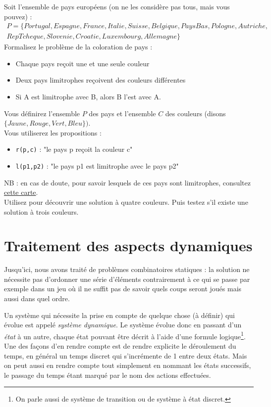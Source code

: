 Soit l'ensemble de pays européens (on ne les considère pas tous, mais vous pouvez) : \\
\begin{multline}
P = \{Portugal, Espagne, France, Italie, Suisse, Belgique, PaysBas, Pologne, Autriche,\\ RepTcheque, Slovenie, Croatie, Luxembourg, Allemagne\}
\end{multline}
Formalisez le problème de la coloration de pays : 
\begin{itemize}
\item Chaque pays reçoit une et une seule couleur
\item Deux pays limitrophes reçoivent des couleurs différentes
\item Si A est limitrophe avec B, alors B l'est avec A. 
\end{itemize}
Vous définirez l'ensemble $P$ des pays et l'ensemble $C$ des couleurs (disons $\{Jaune, Rouge, Vert, Bleu\})$. \\

\noindent Vous utiliserez les propositions : 
\begin{itemize}
\item \texttt{r(p,c)} : "le pays p reçoit la couleur c"
\item \texttt{l(p1,p2)} : "le pays p1 est limitrophe avec le pays p2"
\end{itemize}

NB : en cas de doute, pour savoir lesquels de ces pays sont limitrophes, consultez \href{https://upload.wikimedia.org/wikipedia/commons/6/6a/Europe_countries_map_fr.png}{cette carte}. \\

Utilisez \touist pour découvrir une solution à quatre couleurs. Puis testez s'il existe une solution à trois couleurs. 
\newpage
\section{Traitement des aspects dynamiques}\label{sec:prob}
Jusqu'ici, nous avons traité de problèmes combinatoires statiques : la solution ne nécessite pas d'ordonner une série d'éléments contrairement à ce qui se passe par exemple dans un jeu où il ne suffit pas de savoir quels coups seront joués mais aussi dans quel ordre. 

Un système qui nécessite la prise en compte de quelque chose (à définir) qui évolue est appelé \emph{système dynamique}. Le système évolue donc en passant d'un \emph{état} à un autre, chaque état pouvant être décrit à l'aide d'une formule logique\footnote{On parle aussi de système de transition ou de système à état discret.}. Une des façons d'en rendre compte est de rendre explicite le déroulement du temps, en général un temps discret qui s'incrémente de 1 entre deux états. Mais on peut aussi en rendre compte tout simplement en nommant les états successifs, le passage du temps étant marqué par le nom des actions effectuées. 

